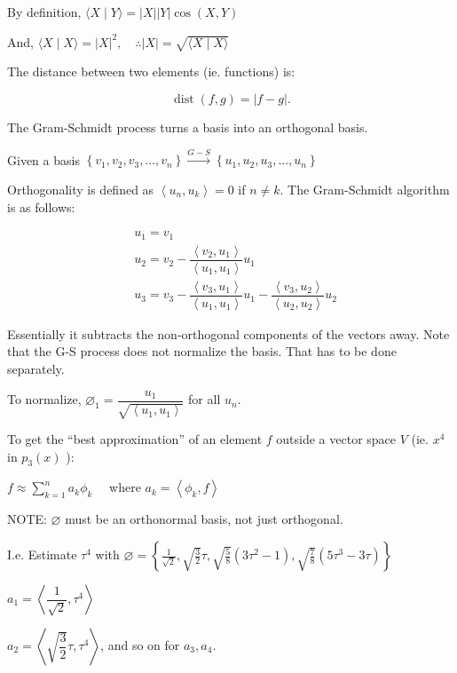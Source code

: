 \documentclass{report}
\begin{document}
By definition, $\langle X \mid Y\rangle=|X||Y| \cos (X, Y)$

And, $\langle X \mid X\rangle=|X|^{2},\quad \therefore|X|=\sqrt{\langle X \mid X\rangle}$

The distance between two elements (ie. functions) is:

$$
\operatorname{dist}(f, g)=|f-g|.
$$

The Gram-Schmidt process turns a basis into an orthogonal basis.

Given a basis $\left\{v_{1}, v_{2}, v_{3}, \ldots, v_{n}\right\} \xrightarrow{G-S}\left\{u_{1}, u_{2}, u_{3}, \ldots, u_{n}\right\}$

Orthogonality is defined as $\left\langle u_{n}, u_{k}\right\rangle=0$ if $n \neq k$. The Gram-Schmidt algorithm is as follows:

$$
\begin{aligned}
& u_{1}=v_{1} \\
& u_{2}=v_{2}-\dfrac{\left\langle v_{2}, u_{1}\right\rangle}{\left\langle u_{1}, u_{1}\right\rangle} u_{1} \\
& u_{3}=v_{3}-\dfrac{\left\langle v_{3}, u_{1}\right\rangle}{\left\langle u_{1}, u_{1}\right\rangle} u_{1}-\dfrac{\left\langle v_{3}, u_{2}\right\rangle}{\left\langle u_{2}, u_{2}\right\rangle} u_{2}
\end{aligned}
$$

Essentially it subtracts the non-orthogonal components of the vectors away. Note that the G-S process does not normalize the basis. That has to be done separately.

To normalize, $\varnothing_{1}=\dfrac{u_{1}}{\sqrt{\left\langle u_{1}, u_{1}\right\rangle}}$ for all $u_{n}$.

To get the ``best approximation'' of an element $f$ outside a vector space $V$ (ie. $x^{4}$ in $p_{3}(x)$ ):

$f \approx \sum\limits_{k=1}^{n} a_{k} \phi_{k} \quad$ where $a_{k}=\left\langle\phi_{k}, f\right\rangle$

NOTE: $\varnothing$ must be an orthonormal basis, not just orthogonal.

I.e. Estimate $\tau^{4}$ with $\varnothing=\left\{\frac{1}{\sqrt{2}}, \sqrt{\frac{3}{2}} \tau, \sqrt{\frac{5}{8}}\left(3 \tau^{2}-1\right), \sqrt{\frac{7}{8}}\left(5 \tau^{3}-3 \tau\right)\right\}$

$a_{1}=\left\langle\dfrac{1}{\sqrt{2}}, \tau^{4}\right\rangle$

$a_{2}=\left\langle\sqrt{\dfrac{3}{2}} \tau, \tau^{4}\right\rangle$, and so on for $a_{3}, a_{4}$.
\end{document}
